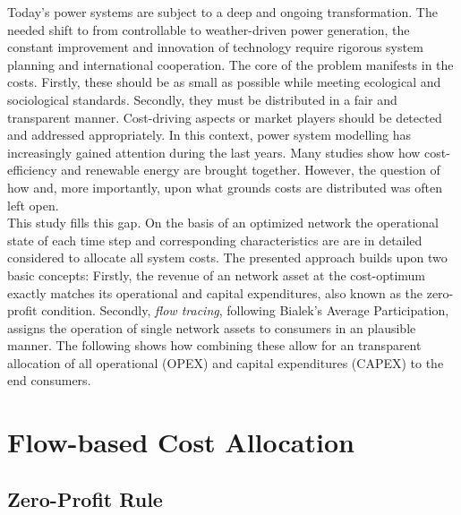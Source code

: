 \documentclass[11pt,twocolumn]{article}
\begin{document}
Today's power systems are subject to a deep and ongoing transformation. The needed shift to from controllable to weather-driven power generation, the constant improvement and innovation of technology require rigorous system planning and international cooperation. The core of the problem manifests in the costs. Firstly, these should be as small as possible while meeting ecological and sociological standards. Secondly, they must be distributed in a fair and transparent manner. Cost-driving aspects or market players should be detected and addressed appropriately. 
In this context, power system modelling has increasingly gained attention during the last years. Many studies show how cost-efficiency and renewable energy are brought together. However, the question of how and, more importantly, upon what grounds costs are distributed was often left open. \\
This study fills this gap. On the basis of an optimized network the operational state of each time step and corresponding characteristics are are in detailed considered to allocate all system costs. The presented approach builds upon two basic concepts: Firstly, the revenue of an network asset at the cost-optimum exactly matches its operational and capital expenditures, also known as the zero-profit condition. Secondly, \textit{flow tracing}, following Bialek's Average Participation, assigns the operation of single network assets to consumers in an plausible manner. 
The following shows how combining these allow for an transparent allocation of all operational (OPEX) and capital expenditures (CAPEX) to the end consumers. 





\section{Flow-based Cost Allocation}

\subsection{Zero-Profit Rule}
\end{document}

